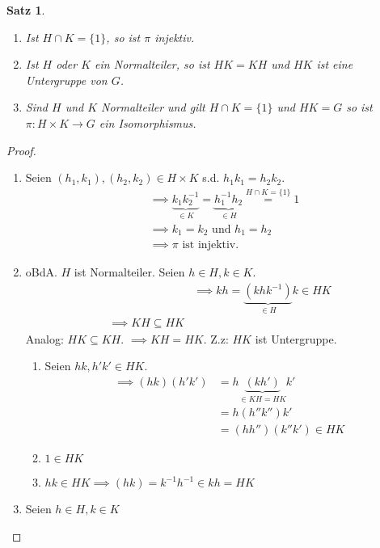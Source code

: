 \documentclass{article}
\theoremstyle{plain}
\newtheorem{theorem}{Satz}
\begin{document}
\begin{theorem}
    \begin{enumerate}[label=(\alph*)]
        \item Ist $H\cap K=\{1\}$, so ist $\pi$ injektiv.
        \item Ist $H$ oder $K$ ein Normalteiler, so ist $HK=KH$ und $HK$ ist eine Untergruppe von $G$.
        \item Sind $H$ und $K$ Normalteiler und gilt $H\cap K=\{1\}$ und $HK=G$ so ist $\pi\colon H\times K\to G$ ein Isomorphismus.
    \end{enumerate}
\end{theorem}
\begin{proof}
    \begin{enumerate}[label=(\alph*)]
        \item Seien $(h_1,k_1),(h_2,k_2)\in H\times K$ s.d. $h_1k_1=h_2k_2$. 
        \begin{align*}
        &\implies \underbrace{k_1k_2^{-1}}_{\in K}=\underbrace{h_1^{-1}h_2}_{\in H}\overset{H\cap K =\{1\}}{=}1\\
        &\implies k_1=k_2 \text{ und } h_1=h_2\\
        &\implies \pi \text{ ist injektiv}.
        \end{align*}
        \item oBdA. $H$ ist Normalteiler. Seien $h\in H, k\in K$.
        \begin{align*}
            &\implies kh=\underbrace{(khk^{-1})}_{\in H}k\in HK\\
            \implies KH\subseteq HK
        \end{align*}
        Analog: $HK\subseteq KH$.
        $\implies KH=HK$.
        Z.z: $HK$ ist Untergruppe.
        \begin{enumerate}[label=(\roman*)]
            \item Seien $hk, h'k'\in HK$. 
            \begin{align*}
                \implies (hk)(h'k')&=h\underbrace{(kh')}_{\in KH=HK}k'\\
                &= h(h''k'')k'\\
                &=(hh'')(k''k')\in HK
            \end{align*}
            \item $1\in HK$
            \item $hk\in HK\implies (hk)=k^{-1}h^{-1}\in kh=HK$
        \end{enumerate}
        \item Seien $h\in H, k\in K$

\end{enumerate}
\end{proof}
\end{document}
